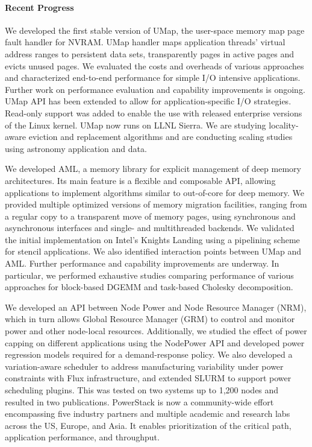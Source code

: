 \paragraph{Recent Progress}

We developed the first stable version of UMap, the user-space memory map
page fault handler for NVRAM.  UMap handler maps application threads'
virtual address ranges to persistent data sets, transparently pages in
active pages and evicts unused pages.  We evaluated the costs and overheads
of various approaches and characterized end-to-end performance for simple
I/O intensive applications.
%
Further work on performance evaluation and capability improvements is
ongoing.  UMap API has been extended to allow for application-specific I/O
strategies.  Read-only support was added to enable the use with released
enterprise versions of the Linux kernel.  UMap now runs on LLNL Sierra.  We
are studying locality-aware eviction and replacement algorithms and are
conducting scaling studies using astronomy application and data.

We developed AML, a memory library for explicit management of deep memory
architectures. Its main feature is a flexible and composable API, allowing
applications to implement algorithms similar to out-of-core for deep
memory.  We provided multiple optimized versions of memory migration
facilities, ranging from a regular copy to a transparent move of memory
pages, using synchronous and asynchronous interfaces and single- and
multithreaded backends.  We validated the initial implementation on Intel's
Knights Landing using a pipelining scheme for stencil applications.  We
also identified interaction points between UMap and AML.  Further
performance and capability improvements are underway.  In particular, we
performed exhaustive studies comparing performance of various approaches
for block-based DGEMM and task-based Cholesky decomposition.

We developed an API between Node Power and Node Resource Manager (NRM),
which in turn allows Global Resource Manager (GRM) to control and monitor
power and other node-local resources.  Additionally, we studied the effect
of power capping on different applications using the NodePower API and
developed power regression models required for a demand-response policy.
We also developed a variation-aware scheduler to address manufacturing
variability under power constraints with Flux infrastructure, and extended
SLURM to support power scheduling plugins.  This was tested on two systems
up to 1,200 nodes and resulted in two publications.  PowerStack is now a
community-wide effort encompassing five industry partners and multiple
academic and research labs across the US, Europe, and Asia.  It enables
prioritization of the critical path, application performance, and
throughput.

